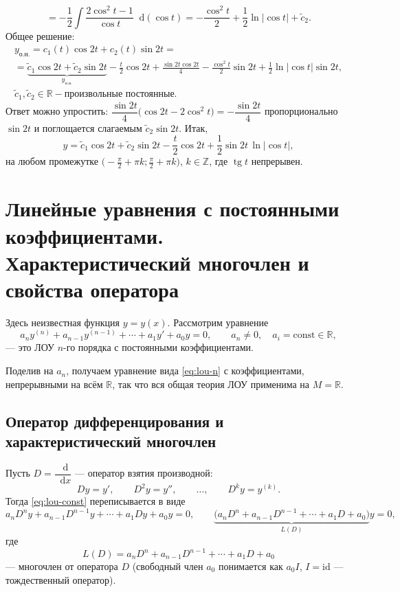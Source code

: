 \documentclass[12pt,a4paper]{article}
\numberwithin{equation}{section}
\newcommand{\R}{\mathbb{R}}
\newcommand{\Z}{\mathbb{Z}}
\newcommand{\dd}{\mathop{}\!\mathrm{d}}
\DeclareRobustCommand{\examtag}[1]{\space{\normalfont\small\color{HSEgray}(#1)}}
\begin{document}
\begin{exampleHSE}[№\,578: \(\ddot y+4y=\operatorname{tg}t\)]
\[=-\frac12\int\frac{2\cos^2t-1}{\cos t}\dd(\cos t)
=-\frac{\cos^2t}{2}+\frac12\ln|\cos t|+\tilde c_2.
\]
Общее решение:
\begin{gather*}
y_{\text{о.н.}}=c_1(t)\cos 2t+c_2(t)\sin 2t=\\
=\underbrace{\tilde c_1\cos2t+\tilde c_2\sin2t}_{y_{\text{о.о.}}}
-\frac t2\cos2t+\frac{\sin2t\cos2t}{4}-\frac{\cos^2t}{2}\sin2t+\frac12\ln|\cos t|\sin2t,\\
\tilde c_1,\tilde c_2\in\R-\text{произвольные постоянные}.
\end{gather*}
Ответ можно упростить: \(\dfrac{\sin2t}{4}\bigl(\cos2t-2\cos^2t\bigr)=-\dfrac{\sin2t}{4}\) пропорционально \(\sin2t\) и поглощается слагаемым \(\tilde c_2\sin2t\). Итак,
\[
y=\tilde c_1\cos2t+\tilde c_2\sin2t-\frac t2\cos2t+\frac12\sin2t\,\ln|\cos t|,
\]
на любом промежутке \(\bigl(-\frac\pi2+\pi k;\frac\pi2+\pi k\bigr)\), \(k\in\Z\), где \(\operatorname{tg}t\) непрерывен.
\end{exampleHSE}

\section[Уравнения с постоянными коэффициентами\examtag{вопросы~19, 20}]{Линейные уравнения с постоянными коэффициентами. Характеристический многочлен и свойства оператора\examtag{вопросы~19, 20}}

Здесь неизвестная функция \(y=y(x)\). Рассмотрим уравнение
\begin{equation}
a_ny^{(n)}+a_{n-1}y^{(n-1)}+\cdots+a_1y'+a_0y=0,
\qquad a_n\neq0,\quad a_i=\mathrm{const}\in\R,
\label{eq:lou-const}
\end{equation}
--- это ЛОУ \(n\)-го порядка с постоянными коэффициентами.

Поделив на \(a_n\), получаем уравнение вида \eqref{eq:lou-n} с коэффициентами, непрерывными на всём \(\R\), так что вся общая теория ЛОУ применима на \(M=\R\).

\subsection{Оператор дифференцирования и характеристический многочлен}

Пусть \(D=\dfrac{\dd}{\dd x}\) --- оператор взятия производной:
\[
Dy=y',\qquad D^2y=y'',\qquad\ldots,\qquad D^ky=y^{(k)}.
\]
Тогда \eqref{eq:lou-const} переписывается в виде
\[
a_nD^ny+a_{n-1}D^{n-1}y+\cdots+a_1Dy+a_0y=0,
\qquad
\underbrace{\bigl(a_nD^n+a_{n-1}D^{n-1}+\cdots+a_1D+a_0\bigr)}_{L(D)}y=0,
\]
где
\[
L(D)=a_nD^n+a_{n-1}D^{n-1}+\cdots+a_1D+a_0
\]
--- многочлен от оператора \(D\) (свободный член \(a_0\) понимается как \(a_0I\), \(I=\mathrm{id}\) --- тождественный оператор).
\end{document}
